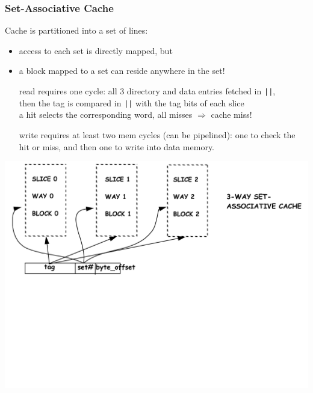 \documentclass{beamer}
\renewcommand{\emph}[1]{\textcolor{structure}{#1}}
\newcommand{\emp}[1]{\textcolor{DikuRed}{ #1}}
\begin{document}
\begin{frame}[fragile,t]
\frametitle{Set-Associative Cache}
 
Cache is partitioned into a set of lines:
\begin{itemize}
    \item \emp{access to each set is directly mapped}, but
    \item \emph{a block mapped to a set can reside anywhere in the set}!
\end  {itemize} 

\begin{itemize}
    \item[read] requires one cycle: all 3 directory and data entries fetched in {\tt ||},\\
                then the tag is compared in {\tt ||} with the tag bits of each slice\\
                a hit selects the corresponding word, all misses $\Rightarrow$ cache miss! 
    \item[write] requires at least two mem cycles (can be pipelined): one to check the hit or miss, 
                and then one to write into data memory. 
                 
\end  {itemize}


\includegraphics[width=55ex]{Figures/FigsMemH/SetAssoc}

\end{frame}
\end{document}
